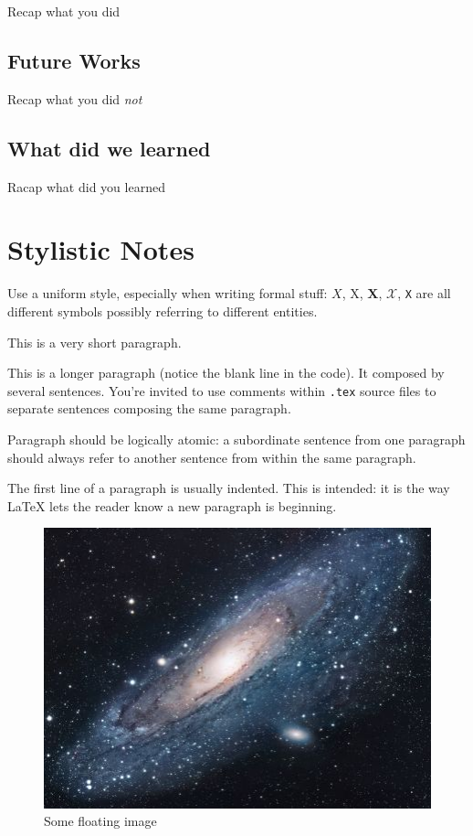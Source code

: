 \documentclass{scrartcl}
\begin{document}
Recap what you did

\subsection{Future Works}

Recap what you did \emph{not}

\subsection{What did we learned}

Racap what did you learned


\section*{Stylistic Notes}

Use a uniform style, especially when writing formal stuff: $X$, X, $\mathbf{X}$, $\mathcal{X}$, \texttt{X} are all different symbols possibly referring to different entities. 

This is a very short paragraph.

This is a longer paragraph (notice the blank line in the code).
It composed by several sentences.
%
You're invited to use comments within \texttt{.tex} source files to separate sentences composing the same paragraph.

Paragraph should be logically atomic: a subordinate sentence from one paragraph should always refer to another sentence from within the same paragraph.

The first line of a paragraph is usually indented.
%
This is intended: it is the way \LaTeX{} lets the reader know a new paragraph is beginning.

\begin{figure} %
    \centering
    \includegraphics[width=0.5\linewidth]{figures/universe.jpg}
    \caption{Some floating image}
    \label{fig:image} 
\end{figure}
\end{document}
